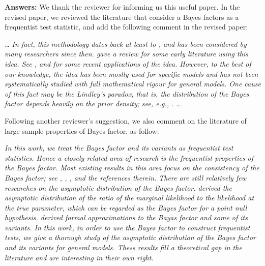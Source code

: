 \documentclass[11pt]{article}
\theoremstyle{plain}
\theoremstyle{definition}
\theoremstyle{remark}
\begin{document}
\textbf{Answers:}
We thank the reviewer for informing us this useful paper.
In the revised paper, we reviewed the literature that consider a Bayes factors as a frequentist test statistic, and add the following comment in the revised paper:
\begin{adjustwidth}{1.5em}{1.5em}
    \emph{
        \dots
In fact, this methodology dates back at least to \cite{Good1967}, and has been considered by many
researchers since then.
\cite{Good1992} gave a review for some early literature using this idea.                                  
See \cite{Aerts2004}, \cite{zhou2018On} and \cite{Wang2020} for some recent applications of the idea. 
However, to the best of our knowledge, the idea has been mostly used for specific models and has not been 
systematically studied with full mathematical rigour for general models.                                  
One cause of this fact may be the Lindley's paradox, that is, the distribution of the Bayes factor        
depends heavily on the prior density; see, e.g., \cite{Shafer1982}. \ldots
}
\end{adjustwidth}
Following another reviewer's suggestion, we also comment on the literature of large sample properties of Bayes factor, as follow:
\begin{adjustwidth}{1.5em}{1.5em}
    \emph{
        In this work, we treat the Bayes factor and its variants as frequentist test statistics.
        Hence a closely related area of research is the frequentist properties of the Bayes factor.
        Most existing results in this area focus on the consistency of the Bayes factor; see \cite{berger2003approximations}, \cite{moreno2010},      \cite{WangMin2016}, \cite{Chatterjee2017} and the references therein.
        There are still relatively few researches on the asymptotic distribution of the Bayes factor.
        \cite{clarke1990information} derived the asymptotic distribution of the ratio of the marginal likelihood to the likelihood at the true parameter, which can be regarded as the Bayes factor for a point null hypothesis.
        \cite{Gelfand1994} derived formal approximations to the Bayas factor and some of its variants.
        In this work, in order to use the Bayes factor to construct frequentist tests, we give a thorough study of the asymptotic distribution of the Bayes factor and its variants for general models.
        Thess results fill a theoretical gap in the literature and are interesting in their own right.
}
\end{adjustwidth}
\end{document}
